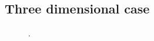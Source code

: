 \documentclass[12pt]{article}
\begin{document}
\subsection{Three dimensional case}
\begin{figure}[!h]
  \centering
    \hspace*{\fill}
  \subfigure{\scalebox{0.5}{}}\hfill
  \subfigure{\scalebox{0.5}{}}\hspace*{\fill}
  \caption{.}
\end{figure}

                                                                                             
                                                                          
\end{document}
